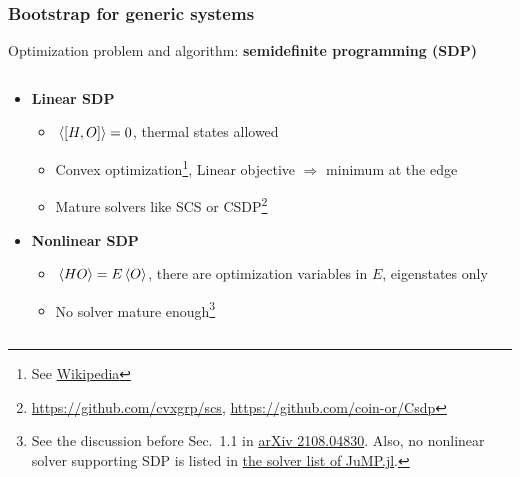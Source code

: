 \documentclass{beamer}
\newcommand{\concept}[1]{\textbf{#1}}
\begin{document}
\begin{frame}
\frametitle{Bootstrap for generic systems}

Optimization problem and algorithm: \concept{semidefinite programming (SDP)}

\begin{columns}
    \begin{column}{0.6\textwidth}
        \begin{itemize}
            \item \concept{Linear SDP} 
            \begin{itemize}
                \item $\expval*{\comm{H}{O}} = 0$, thermal states allowed
                \item Convex optimization\footnote[frame]{See \href{https://en.wikipedia.org/wiki/Semidefinite_programming}{Wikipedia}}, Linear objective $\Rightarrow$ minimum at the edge
                \item Mature solvers like SCS or CSDP\footnote[frame]{\href{https://github.com/cvxgrp/scs}{https://github.com/cvxgrp/scs}, \href{https://github.com/coin-or/Csdp}{https://github.com/coin-or/Csdp}}
            \end{itemize}
            \item \concept{Nonlinear SDP} 
            \begin{itemize}
                \item $\expval*{{H}{O}} = E \expval*{O}$, there are optimization variables in $E$, eigenstates only
                \item No solver mature enough\footnote[frame]{See the discussion before Sec.~1.1 in \href{https://arxiv.org/abs/2108.04830}{arXiv 2108.04830}. Also, no nonlinear solver supporting SDP is listed in \href{https://jump.dev/JuMP.jl/stable/installation/}{the solver list of JuMP.jl}.}
            \end{itemize}
        \end{itemize} 
    \end{column}
    \begin{column}{0.4\textwidth}

\end{column}
\end{columns}
\end{frame}
\end{document}
